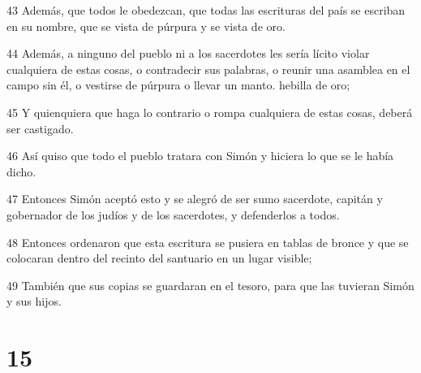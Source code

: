 \par 43 Además, que todos le obedezcan, que todas las escrituras del país se escriban en su nombre, que se vista de púrpura y se vista de oro.
\par 44 Además, a ninguno del pueblo ni a los sacerdotes les sería lícito violar cualquiera de estas cosas, o contradecir sus palabras, o reunir una asamblea en el campo sin él, o vestirse de púrpura o llevar un manto. hebilla de oro;
\par 45 Y quienquiera que haga lo contrario o rompa cualquiera de estas cosas, deberá ser castigado.
\par 46 Así quiso que todo el pueblo tratara con Simón y hiciera lo que se le había dicho.
\par 47 Entonces Simón aceptó esto y se alegró de ser sumo sacerdote, capitán y gobernador de los judíos y de los sacerdotes, y defenderlos a todos.
\par 48 Entonces ordenaron que esta escritura se pusiera en tablas de bronce y que se colocaran dentro del recinto del santuario en un lugar visible;
\par 49 También que sus copias se guardaran en el tesoro, para que las tuvieran Simón y sus hijos.

\chapter{15}

